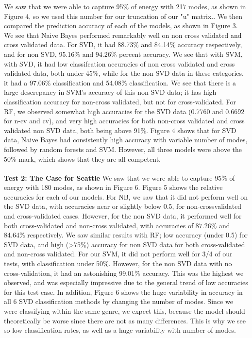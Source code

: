 \documentclass{article}
\begin{document}
	We saw that we were able to capture 95\% of energy with 217 modes, as shown in Figure 4, so we used this number for our truncation of our "u" matrix.. We then compared the prediction accuracy of each of the models, as shown in Figure 3. We see that Naive Bayes performed remarkably well on non cross validated and cross validated data. For SVD, it had 88.73\% and 84.14\% accuracy respectively, and for non SVD, 95.16\% and 94.26\% percent accuracy. We see that with SVM, with SVD, it had low classifcation accuracies of non cross validated and cross validated data, both under 45\%, while for the non SVD data in these categories, it had a 97.06\% classification and 54.08\% classification. We see that there is a large descrepancy in SVM's accuracy of this non SVD data; it has high classification accuracy for non-cross validated, but not for cross-validated. For RF, we observed somewhat high accuracies for the SVD data (0.7760 and 0.6692 for n-cv and cv), and very high accuracies for both non-cross validated and cross validated non SVD data, both being above 91\%. Figure 4 shows that for SVD data, Naive  Bayes had consistently high accuracy with variable number of modes, followed by random forests and SVM. However, all three models were above the 50\% mark, which shows that they are all competent. \\ \\
\textbf{Test 2: The Case for Seattle}
We saw that we were able to capture 95\% of energy with 180 modes, as shown in Figure 6. Figure 5 shows the relative accuracies for each of our models. For NB, we saw that it did not perform well on the SVD data, with accuracies near or slightly below 0.5, for non-crossvalidated and cross-validated cases. However, for the non SVD data, it performed well for both cross-validated and non-cross validated, with accuracies of 87.26\% and 84.64\% respectively.  We saw similar results with RF; low accuracy (under 0.5) for SVD data, and high (>75\%) accuracy for non SVD data for both cross-validated and non-cross validated. For our SVM, it did not perform well for 3/4 of our tests, with classification under 50\%. However, for the non SVD data with no cross-validation, it had an astonishing 99.01\% accuracy. This was the highest we observed, and was especially impressive due to the general trend of low accuracies for this test case. In addition, Figure 6 shows the huge variability in accuracy in all 6 SVD classification methods by changing the number of modes. Since we were classifying within the same genre, we expect this, because the model should theoretically be worse since there are not as many differences. This is why we see so low classification rates, as well as a huge variability with number of modes. \\ \\
\end{document}
